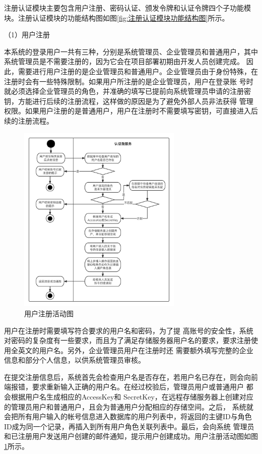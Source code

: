 注册认证模块主要包含用户注册、密码认证、颁发令牌和认证令牌四个子功能模块。注册认证模块的功能结构图如图\ref{fig:注册认证模块功能结构图}所示。



（1）用户注册

本系统的登录用户一共有三种，分别是系统管理员、企业管理员和普通用户，其中系统管理员是不需要注册的，因为它会在项目部署初期由开发人员创建完成。
因此，需要进行用户注册的是企业管理员和普通用户。企业管理员由于身份特殊，在注册时会有一些特殊限制。如果用户所注册的是企业管理员，用户在登录账
号时就必须选择企业管理员的角色，并准确的填写已提前向系统管理员申请的注册密钥，方能进行后续的注册流程，这样做的原因是为了避免外部人员非法获得
管理权限。如果用户注册的是普通用户，用户在注册时不需要填写密钥，可直接进入后续的注册流程。
\begin{figure}[h]
    \centering
    \includegraphics[width=0.7\textwidth]{my_figures/chapter4/用户注册活动图.png}
    \caption{用户注册活动图}
    \label{fig:用户注册活动图}
\end{figure}
用户在注册时需要填写符合要求的用户名和密码，为了提
高账号的安全性，系统对密码的复杂度有一些要求，而且为了满足存储服务器用户名的要求，要求注册使用全英文的用户名。另外，企业管理员用户在注册时还
需要额外填写完整的企业信息和部分个人信息，以供系统管理员审核。


在提交注册信息后，系统首先会检查用户名是否存在，若用户名已存在，则会向前端报错，要求重新输入正确的用户名。在经过校验后，管理员用户或普通用户
都会根据用户名生成相应的AccessKey和 SecretKey，在远程存储服务器上创建对应的管理员用户和普通用户，且会为普通用户分配相应的存储空间。之后，
系统就会把所有用户输入的帐号信息进入数据库的用户列表中，将返回的主键ID与角色ID成为同一个记录，再插入到所有用户角色关联列表中。最后，会向系统
管理员和已注册用户发送用户创建的邮件通知，提示用户创建成功。用户注册活动图如图\ref{fig:用户注册活动图}所示。

